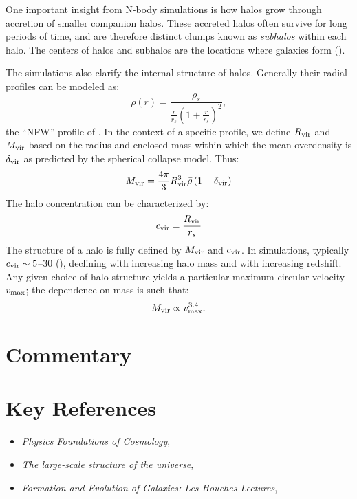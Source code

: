 One important insight from N-body simulations is how halos grow through
accretion of smaller companion halos. These accreted halos often
survive for long periods of time, and are therefore distinct clumps
known as {\it subhalos} within each halo. The centers of halos and
subhalos are the locations where galaxies form (\citealt{wechsler18a}).

The simulations also clarify the internal structure of
halos. Generally their radial profiles can be modeled as:
\begin{equation}
\rho(r) = \frac{\rho_s}{\frac{r}{r_s}\left(1
+ \frac{r}{r_s}\right)^2},
\end{equation}
the ``NFW'' profile of \citet{navarro97a}. In the context of a
specific profile, we define $R_{\rm vir}$ and $M_{\rm vir}$ based on
the radius and enclosed mass within which the mean overdensity is
$\delta_{\rm vir}$ as predicted by the spherical collapse model. Thus:
\begin{equation}
M_{\rm vir} = \frac{4\pi}{3} R_{\rm vir}^3 \bar\rho \left(1+ \delta_{\rm
vir}\right)
\end{equation}
The halo concentration can be characterized by:
\begin{equation}
c_{\rm vir} = \frac{R_{\rm vir}}{r_s}
\end{equation}
The structure of a halo is fully defined by $M_{\rm vir}$ and $c_{\rm
vir}$. In simulations, typically $c_{\rm vir} \sim 5$--$30$
(\citealt{bullock01b; wang20a}), declining with increasing halo mass
and with increasing redshift. Any given choice of halo structure
yields a particular maximum circular velocity $v_{\rm max}$; the
dependence on mass is such that:
\begin{equation}
M_{\rm vir} \propto v_{\rm max}^{3.4}.
\end{equation}

\section{Commentary}


\section{Key References}

\begin{itemize}
  \item
    {\it Physics Foundations of Cosmology},
    \citet{mukhanov05a}
  \item
    {\it The large-scale structure of the
    universe}, \citet{peebles80a}
  \item
    {\it Formation and Evolution of Galaxies: Les Houches
    Lectures}, \citet{white94a} 
\end{itemize}

